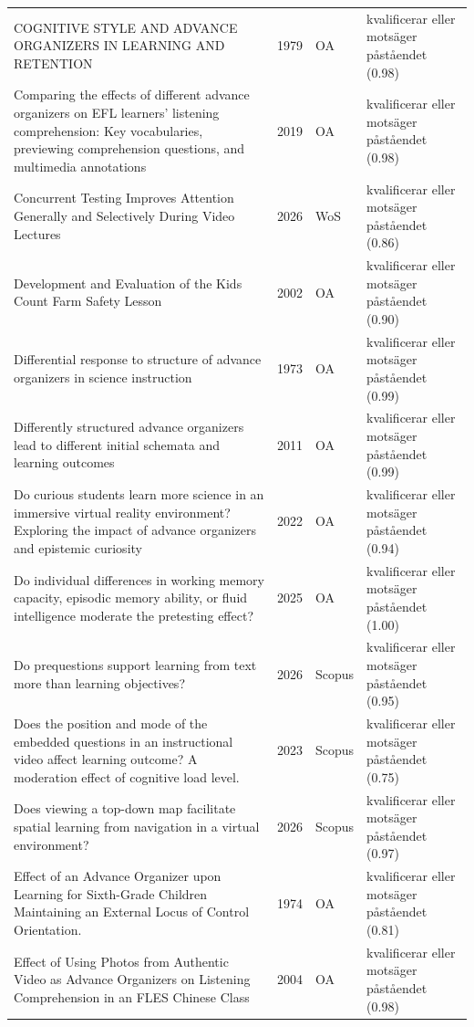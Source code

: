 \begin{longtable}{@{}%
  >{\raggedright\arraybackslash}p{}c%
  >{\raggedright\arraybackslash}p{}%
  >{\raggedright\arraybackslash}p{}@{}}
COGNITIVE STYLE AND ADVANCE ORGANIZERS IN LEARNING AND RETENTION & 1979 & OA & kvalificerar eller motsäger påståendet (0.98) \\
Comparing the effects of different advance organizers on EFL learners' listening comprehension: Key vocabularies, previewing comprehension questions, and multimedia annotations & 2019 & OA & kvalificerar eller motsäger påståendet (0.98) \\
Concurrent Testing Improves Attention Generally and Selectively During Video Lectures & 2026 & WoS & kvalificerar eller motsäger påståendet (0.86) \\
Development and Evaluation of the Kids Count Farm Safety Lesson & 2002 & OA & kvalificerar eller motsäger påståendet (0.90) \\
Differential response to structure of advance organizers in science instruction & 1973 & OA & kvalificerar eller motsäger påståendet (0.99) \\
Differently structured advance organizers lead to different initial schemata and learning outcomes & 2011 & OA & kvalificerar eller motsäger påståendet (0.99) \\
Do curious students learn more science in an immersive virtual reality environment? Exploring the impact of advance organizers and epistemic curiosity & 2022 & OA & kvalificerar eller motsäger påståendet (0.94) \\
Do individual differences in working memory capacity, episodic memory ability, or fluid intelligence moderate the pretesting effect? & 2025 & OA & kvalificerar eller motsäger påståendet (1.00) \\
Do prequestions support learning from text more than learning objectives? & 2026 & Scopus & kvalificerar eller motsäger påståendet (0.95) \\
Does the position and mode of the embedded questions in an instructional video affect learning outcome? A moderation effect of cognitive load level. & 2023 & Scopus & kvalificerar eller motsäger påståendet (0.75) \\
Does viewing a top-down map facilitate spatial learning from navigation in a virtual environment? & 2026 & Scopus & kvalificerar eller motsäger påståendet (0.97) \\
Effect of an Advance Organizer upon Learning for Sixth-Grade Children Maintaining an External Locus of Control Orientation. & 1974 & OA & kvalificerar eller motsäger påståendet (0.81) \\
Effect of Using Photos from Authentic Video as Advance Organizers on Listening Comprehension in an FLES Chinese Class & 2004 & OA & kvalificerar eller motsäger påståendet (0.98) \\

\end{longtable}
